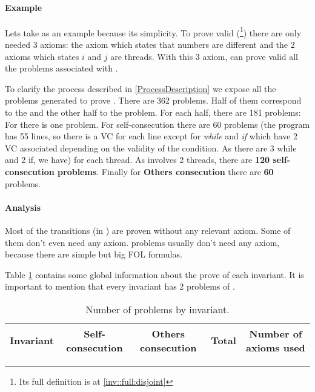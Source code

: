 \paragraph{Example}
Lets take \invDisjoint as an example because its simplicity.
%
To prove \invDisjoint valid
%
(\footnote{Its full definition is at \ref{inv::full:disjoint}})
%
there are only needed 3 axioms: the axiom which states that numbers are different and the 2 axioms which states $i$ and $j$ are threads. 
%
With this 3 axiom, \spass can prove valid all the \spass problems associated with \invDisjoint.


To clarify the process described in \ref{ProcessDescription} we expose all the \spass problems generated to prove \invDisjoint.
%
There are 362 \spass problems. Half of them correspond to the \reducedProblem and the other half to the \smallToBig problem.
%
For each half, there are 181 \spass problems:
%
For \textbf{\instantiation} there is one problem. 
%
For self-consecution there are 60 \spass problems (the program has 55 lines, so there is a \gls{VC} for each line except for \textit{while} and \textit{if} which have 2 \gls{VC} associated depending on the validity of the condition. As there are 3 while and 2 if, we have) for each thread. 
%
As \invDisjoint involves 2 threads, there are \textbf{120 self-consecution \spass problems}.
%
Finally for \textbf{Others consecution} there are \textbf{60} \spass problems.

\paragraph{Analysis}

Most of the transitions (\numTransitionsProvedWithPC in \numTotalTransitions) are proven without any relevant axiom. 
%
Some of them don't even need any axiom. 
%
\smallToBig problems usually don't need any axiom, because there are simple but big \gls{FOL} formulas.

Table \ref{table:analysisProofs}  contains some global information about the prove of each invariant.
%
It is important to mention that every invariant has 2 problems of \instantiation. 

\begin{table}[hbtp]
\centering
\begin{tabular}{c|cccc}
Invariant & Self-consecution & Others consecution & Total & Number of axioms used\\\hline

\end{tabular}
\label{table:analysisProofs}
\caption{Number of \spass problems by invariant.}
\end{table}



